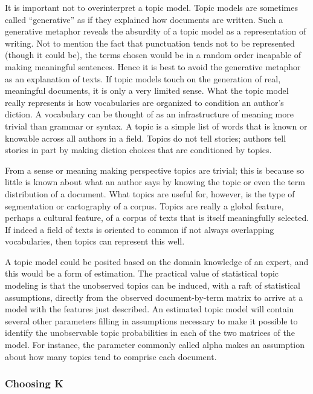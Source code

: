 \documentclass[]{book}
\theoremstyle{definition}
\theoremstyle{definition}
\theoremstyle{definition}
\theoremstyle{remark}
\begin{document}
It is important not to overinterpret a topic model. Topic models are
sometimes called ``generative'' as if they explained how documents are
written. Such a generative metaphor reveals the absurdity of a topic
model as a representation of writing. Not to mention the fact that
punctuation tends not to be represented (though it could be), the terms
chosen would be in a random order incapable of making meaningful
sentences. Hence it is best to avoid the generative metaphor as an
explanation of texts. If topic models touch on the generation of real,
meaningful documents, it is only a very limited sense. What the topic
model really represents is how vocabularies are organized to condition
an author's diction. A vocabulary can be thought of as an infrastructure
of meaning more trivial than grammar or syntax. A topic is a simple list
of words that is known or knowable across all authors in a field. Topics
do not tell stories; authors tell stories in part by making diction
choices that are conditioned by topics.

From a sense or meaning making perspective topics are trivial; this is
because so little is known about what an author says by knowing the
topic or even the term distribution of a document. What topics are
useful for, however, is the type of segmentation or cartography of a
corpus. Topics are really a global feature, perhaps a cultural feature,
of a corpus of texts that is itself meaningfully selected. If indeed a
field of texts is oriented to common if not always overlapping
vocabularies, then topics can represent this well.

A topic model could be posited based on the domain knowledge of an
expert, and this would be a form of estimation. The practical value of
statistical topic modeling is that the unobserved topics can be induced,
with a raft of statistical assumptions, directly from the observed
document-by-term matrix to arrive at a model with the features just
described. An estimated topic model will contain several other
parameters filling in assumptions necessary to make it possible to
identify the unobservable topic probabilities in each of the two
matrices of the model. For instance, the parameter commonly called alpha
makes an assumption about how many topics tend to comprise each
document.

\hypertarget{choosing-k}{%
\subsubsection{Choosing K}\label{choosing-k}}
\end{document}
